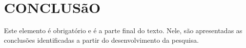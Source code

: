 \documentclass[
  oneside, %
  english,
  brazil
]{abntbibufjf}
\begin{document}



\chapter{CONCLUSãO} %

Este elemento é obrigatório e é a parte final do texto.  Nele, são apresentadas as conclusões identificadas a partir do desenvolvimento da pesquisa.



\postextual



\end{document}
